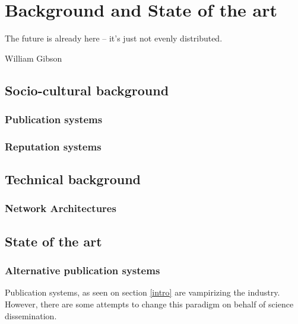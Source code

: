 \chapter{Background and State of the art}

\begin{FraseCelebre}
  \begin{Frase}
    The future is already here – it's just not evenly distributed.
  \end{Frase}
  \begin{Fuente}
    William Gibson
  \end{Fuente}
\end{FraseCelebre}


\section{Socio-cultural background}
\label{scb}
\subsection{Publication systems}
\label{scb:ps}
\subsection{Reputation systems}
\label{scb:rs}
\section{Technical background}
\label{tb}
\subsection{Network Architectures}
\label{tb:na}

\section{State of the art}
\subsection{Alternative publication systems}
\label{soa:aps}
Publication systems, as seen on section \ref{intro} are vampirizing the
industry. However, there are some attempts to change this paradigm on behalf of
science dissemination.

